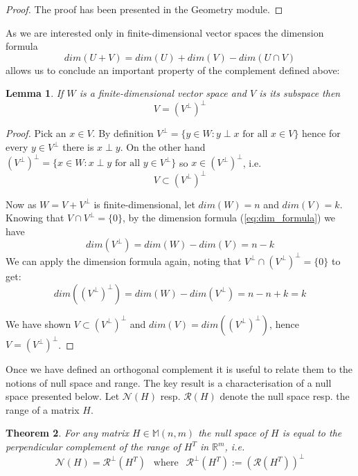 \documentclass[a4paper,11pt]{article}
\theoremstyle{break}
\newtheorem{theorem}{Theorem}[section]
\newtheorem{lemma}[theorem]{Lemma}
\newcommand{\R}{\mathbb{R}}
\newcommand{\Nu}{\mathcal{N}}
\newcommand{\Ra}{\mathcal{R}}
\newcommand{\Mat}[2]{\mathbb{M}(#1, #2)}
\begin{document}
\begin{proof}
    The proof has been presented in the Geometry module.
\end{proof}

As we are interested only in finite-dimensional vector spaces the dimension formula
\begin{equation}\label{eq:dim_formula}
    dim(U + V) = dim(U) + dim(V) - dim( U \cap V)
\end{equation}
allows us to conclude an important property of the complement defined above:

\begin{lemma}\label{lem:double_perp}
    If $W$ is a finite-dimensional vector space and $V$ is its subspace then
    $$ V = (V^\perp)^\perp $$
\end{lemma}

\begin{proof}
    Pick an $x \in V$.
    By definition $ V^\perp = \{ y \in W : y \perp x \text{ for all } x \in V \}$ 
    hence for every $y \in V^\perp $ there is $x \perp y$.
    On the other hand 
    $ (V^\perp)^\perp = \{ x \in W : x \perp y \text{ for all } y \in V^\perp \}$ so 
    $x \in (V^\perp)^\perp$, i.e.
    $$ V \subset (V^\perp)^\perp$$

    Now as $W = V + V^\perp$ is finite-dimensional, let $dim(W) = n$ and $dim(V) = k$. 
    Knowing that $V \cap V^\perp = \{0\}$, by the dimension formula (\ref{eq:dim_formula}) we have
    $$ dim(V^\perp) = dim(W) - dim(V) = n - k $$
    We can apply the dimension formula again, noting that $ V^\perp \cap (V^\perp)^\perp = \{0\} $ to get:
    $$ dim((V^\perp)^\perp) = dim(W) - dim(V^\perp) = n - n + k = k $$

    We have shown $ V \subset (V^\perp)^\perp$ and $ dim(V) = dim((V^\perp)^\perp)$,
    hence $ V = (V^\perp)^\perp$.
\end{proof}

Once we have defined an orthogonal complement it is useful to relate them to the notions of null space and range.
The key result is a characterisation of a null space presented below.
Let $\Nu(H)$ resp. $\Ra(H)$ denote the null space resp. the range of a matrix $H$.

\begin{theorem} \label{thm:charact_nullspace}
    For any matrix $H \in \Mat{n}{m}$ the null space of $H$ is equal to the perpendicular complement of the range of $H^T$ in $\R^m$, i.e.
    $$\Nu(H) = \Ra^\perp(H^T) ~~\text{ where }~~ \Ra^\perp(H^T) := (\Ra(H^T))^\perp$$
\end{theorem}
\end{document}
